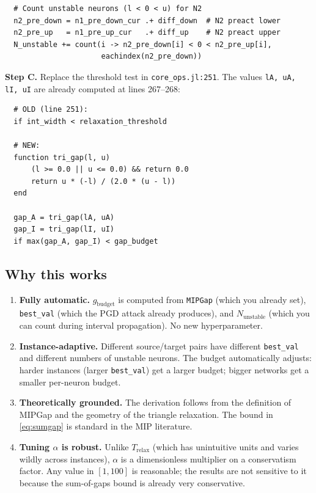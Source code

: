 \documentclass[11pt,a4paper]{article}
\newcommand{\Trelax}{T_{\mathrm{relax}}}
\begin{document}
\begin{verbatim}
  # Count unstable neurons (l < 0 < u) for N2
  n2_pre_down = n1_pre_down_cur .+ diff_down  # N2 preact lower
  n2_pre_up   = n1_pre_up_cur   .+ diff_up    # N2 preact upper
  N_unstable += count(i -> n2_pre_down[i] < 0 < n2_pre_up[i],
                      eachindex(n2_pre_down))
\end{verbatim}

\textbf{Step C.}  Replace the threshold test in \texttt{core\_ops.jl:251}.
The values \texttt{lA, uA, lI, uI} are already computed at lines 267--268:

\begin{verbatim}
  # OLD (line 251):
  if int_width < relaxation_threshold

  # NEW:
  function tri_gap(l, u)
      (l >= 0.0 || u <= 0.0) && return 0.0
      return u * (-l) / (2.0 * (u - l))
  end

  gap_A = tri_gap(lA, uA)
  gap_I = tri_gap(lI, uI)
  if max(gap_A, gap_I) < gap_budget
\end{verbatim}

\subsection{Why this works}\label{sec:m7:why}

\begin{enumerate}
  \item \textbf{Fully automatic.}  $g_{\mathrm{budget}}$ is computed from
        \texttt{MIPGap} (which you already set), \texttt{best\_val} (which the
        PGD attack already produces), and $N_{\mathrm{unstable}}$ (which you
        can count during interval propagation).  No new hyperparameter.

  \item \textbf{Instance-adaptive.}  Different source/target pairs have
        different \texttt{best\_val} and different numbers of unstable neurons.
        The budget automatically adjusts: harder instances (larger
        \texttt{best\_val}) get a larger budget; bigger networks get a smaller
        per-neuron budget.

  \item \textbf{Theoretically grounded.}  The derivation follows from the
        definition of MIPGap and the geometry of the triangle relaxation.
        The bound in \cref{eq:sumgap} is standard in the MIP literature.

  \item \textbf{Tuning $\alpha$ is robust.}  Unlike $\Trelax$ (which has
        unintuitive units and varies wildly across instances), $\alpha$ is
        a dimensionless multiplier on a conservatism factor.  Any value in
        $[1, 100]$ is reasonable; the results are not sensitive to it because
        the sum-of-gaps bound is already very conservative.
\end{enumerate}
\end{document}
